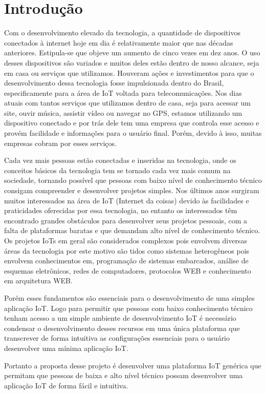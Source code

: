 \documentclass[../../layout.tex]{subfiles}
\begin{document}
\chapter{Introdução}
\hspace*{3em}Com o desenvolvimento elevado da tecnologia, a quantidade de dispositivos conectados à internet hoje em dia é relativamente maior que nas décadas anteriores. Estipula-se que objeve um aumento de cinco vezes em dez anos\cite{conectdevicesnum}. O uso desses dispositivos são variados e muitos deles estão dentro de nosso alcance, seja em casa ou serviços que utilizamos. Houveram ações e investimentos para que o desenvolvimento dessa tecnologia fosse impulsionada dentro do Brasil, especificamente para a área de IoT voltada para telecomunicações\cite{iotinvest}. Nos dias atuais com tantos serviços que utilizamos dentro de casa, seja para acessar um site, ouvir música, assistir vídeo ou navegar no GPS, estamos utilizando um dispositivo conectado e por trás dele tem uma empresa que controla esse acesso e provém facilidade e informações para o usuário final. Porém, devido à isso, muitas empresas cobram por esses serviços.\par
Cada vez mais pessoas estão conectadas e inseridas na tecnologia, onde os conceitos básicos da tecnologia tem se tornado cada vez mais comum na sociedade, tornando possível  que pessoas com baixo nível de conhecimento técnico consigam compreender e desenvolver projetos simples. Nos últimos anos surgiram muitos interessados na área de IoT (Internet da coisas) devido às facilidades e praticidades oferecidas por essa tecnologia, no entanto os interessados têm encontrado grandes obstáculos para desenvolver seus projetos pessoais, com a falta de plataformas baratas e que demandam alto nível de conhecimento técnico.\apr
Os projetos IoTs em geral são considerados complexos pois envolvem diversas áreas da tecnologia por este motivo são tidos como sistemas heterogêneos pois envolvem conhecimentos em, programação de sistemas embarcados, análise de esquemas eletrônicos, redes de computadores, protocolos WEB e conhecimento em arquitetura WEB. \par
Porém esses fundamentos são essenciais para o desenvolvimento de uma simples aplicação IoT. Logo para permitir que pessoas com baixo conhecimento técnico tenham acesso a um simple ambiente de desenvolvimento IoT é necessário condensar o desenvolvimento desses recursos em uma única plataforma  que transcrever  de forma intuitiva as configurações essenciais para o usuário desenvolver uma mínima aplicação IoT.\cite{IoTeveryone} \par
Portanto a proposta desse projeto é  desenvolver uma plataforma IoT  genérica que permitam que pessoas de baixa e alto nível técnico possam desenvolver uma aplicação IoT de forma fácil e intuitiva.
\end{document}
